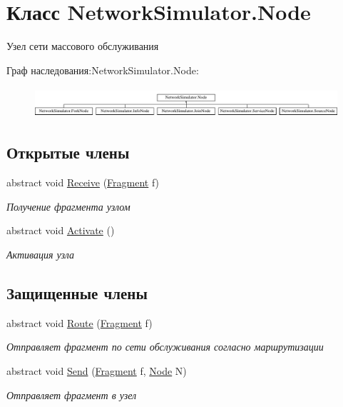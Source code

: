 \hypertarget{class_network_simulator_1_1_node}{}\section{Класс Network\+Simulator.\+Node}
\label{class_network_simulator_1_1_node}


Узел сети массового обслуживания  


Граф наследования\+:Network\+Simulator.\+Node\+:\begin{figure}[H]
\begin{center}
\leavevmode
\includegraphics[height=1.142857cm]{class_network_simulator_1_1_node}
\end{center}
\end{figure}
\subsection*{Открытые члены}
\begin{DoxyCompactItemize}
\item 
abstract void \hyperlink{class_network_simulator_1_1_node_ab1d7ae2e2e59169e9ab3086087d950e8}{Receive} (\hyperlink{class_network_simulator_1_1_fragment}{Fragment} f)
\begin{DoxyCompactList}\small\item\em Получение фрагмента узлом \end{DoxyCompactList}\item 
abstract void \hyperlink{class_network_simulator_1_1_node_a1f558044a94581467ba00d12bf1ae8fd}{Activate} ()
\begin{DoxyCompactList}\small\item\em Активация узла \end{DoxyCompactList}\end{DoxyCompactItemize}
\subsection*{Защищенные члены}
\begin{DoxyCompactItemize}
\item 
abstract void \hyperlink{class_network_simulator_1_1_node_afc4e83369cdce31db59b1023113c01f2}{Route} (\hyperlink{class_network_simulator_1_1_fragment}{Fragment} f)
\begin{DoxyCompactList}\small\item\em Отправляет фрагмент по сети обслуживания согласно маршрутизации \end{DoxyCompactList}\item 
abstract void \hyperlink{class_network_simulator_1_1_node_abcda5067b8842a447b2ad293818fc319}{Send} (\hyperlink{class_network_simulator_1_1_fragment}{Fragment} f, \hyperlink{class_network_simulator_1_1_node}{Node} N)
\begin{DoxyCompactList}\small\item\em Отправляет фрагмент в узел \end{DoxyCompactList}\end{DoxyCompactItemize}

